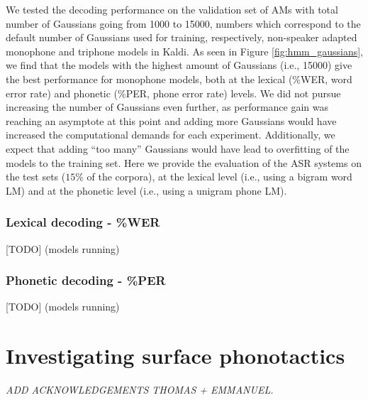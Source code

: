 We tested the decoding performance on the validation set of AMs with total number of Gaussians going from 1000 to 15000, numbers which correspond to the default number of Gaussians used for training, respectively, non-speaker adapted monophone and triphone models in Kaldi. 
As seen in Figure \ref{fig:hmm_gaussians}, we find that the models with the highest amount of Gaussians (i.e., 15000) give the best performance for monophone models, both at the lexical (\%WER, word error rate) and phonetic (\%PER, phone error rate) levels.
We did not pursue increasing the number of Gaussians even further, as performance gain was reaching an asymptote at this point and adding more Gaussians would have increased the computational demands for each experiment. Additionally, we expect that adding ``too many'' Gaussians would have lead to overfitting of the models to the training set. Here we provide the evaluation of the ASR systems on the test sets ($15\%$ of the corpora), at the lexical level (i.e., using a bigram word LM) and at the phonetic level (i.e., using a unigram phone LM).  


\subsubsection{Lexical decoding - \%WER}
{\color{red}[TODO] (models running)}

\subsubsection{Phonetic decoding - \%PER}
{\color{red}[TODO] (models running)}


\newpage
\section{{\color{red}Investigating surface phonotactics}} \label{3-surfphono}

\small{\textit{{\color{red}ADD ACKNOWLEDGEMENTS THOMAS + EMMANUEL.\\}}}

